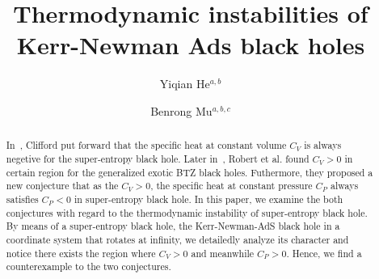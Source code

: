 \documentclass[aps,preprint]{revtex4}%
\begin{document}
\title{Thermodynamic instabilities of Kerr-Newman Ads black holes}
\author{}
\author{Yiqian He$^{a,b}$}
\author{Benrong Mu$^{a,b,c}$}
	




\begin{abstract}
In~\cite{Johnson:2019mdp}, Clifford put forward that the specific heat at constant volume $C_{V}$ is always negetive for the super-entropy black hole. Later in~\cite{Cong:2019bud}, Robert et al. found $C_{V}>0$ in certain region for the generalized exotic
BTZ black holes. Futhermore, they proposed a new conjecture that as the $C_{V}>0$, the specific heat at constant pressure $C_{P}$ always satisfies $C_{P}<0$ in super-entropy black hole. In this paper, we examine the both conjectures with regard to the thermodynamic instability of super-entropy black hole. By means of a super-entropy black hole, the Kerr-Newman-AdS black hole in a coordinate system that rotates at infinity, we detailedly analyze its character and notice there exists the region where $C_{V}>0$ and meanwhile $C_{P}>0$. Hence, we find a counterexample to the two conjectures.
\end{abstract}
\keywords{}

\maketitle
\tableofcontents{}

\bigskip{}

\end{document}
